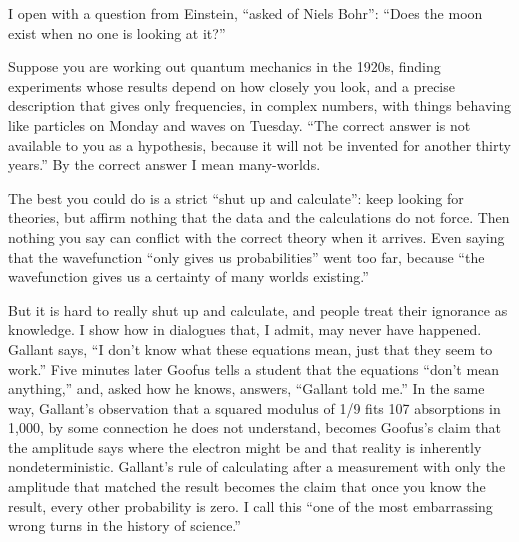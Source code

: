 
I open with a question from Einstein, ``asked of Niels Bohr'': ``Does the moon exist when no one is looking at it?'' 

Suppose you are working out quantum mechanics in the 1920s, finding experiments whose results depend on how closely you look, and a precise description that gives only frequencies, in complex numbers, with things behaving like particles on Monday and waves on Tuesday. ``The correct answer is not available to you as a hypothesis, because it will not be invented for another thirty years.'' By the correct answer I mean many-worlds. 

The best you could do is a strict ``shut up and calculate'': keep looking for theories, but affirm nothing that the data and the calculations do not force.  Then nothing you say can conflict with the correct theory when it arrives. Even saying that the wavefunction ``only gives us probabilities'' went too far, because ``the wavefunction gives us a certainty of many worlds existing.'' 

But it is hard to really shut up and calculate, and people treat their ignorance as knowledge. I show how in dialogues that, I admit, may never have happened. Gallant says, ``I don't know what these equations mean, just that they seem to work.'' Five minutes later Goofus tells a student that the equations ``don't mean anything,'' and, asked how he knows, answers, ``Gallant told me.'' In the same way, Gallant's observation that a squared modulus of 1/9 fits 107 absorptions in 1,000, by some connection he does not understand, becomes Goofus's claim that the amplitude says where the electron might be and that reality is inherently nondeterministic. Gallant's rule of calculating after a measurement with only the amplitude that matched the result becomes the claim that once you know the result, every other probability is zero. I call this ``one of the most embarrassing wrong turns in the history of science.'' 

